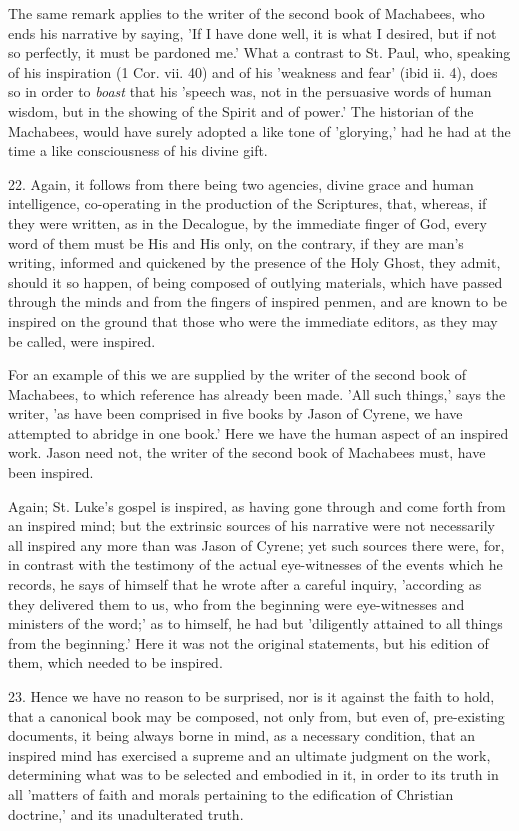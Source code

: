 The same remark applies to the writer of the
second book of Machabees, who ends his narrative by saying, 'If I have
done well, it is what I desired, but if not so perfectly, it must be
pardoned me.' What a contrast to St. Paul, who, speaking of his
inspiration (1 Cor. vii. 40) and of his 'weakness and fear' (ibid ii.
4), does so in order to \emph{boast} that his 'speech was, not in the
persuasive words of human wisdom, but in the showing of the Spirit and
of power.' The historian of the Machabees, would have surely adopted a
like tone of 'glorying,' had he had at the time a like consciousness
of his divine gift.

22. Again, it follows from there being two
agencies, divine grace and human intelligence, co-operating in the
production of the Scriptures, that, whereas, if they were written, as
in the Decalogue, by the immediate finger of God, every word of them
must be His and His only, on the contrary, if they are man's writing,
informed and quickened by the presence of the Holy Ghost, they admit,
should it so happen, of being composed of outlying materials, which
have passed through the minds and from the fingers of inspired penmen,
and are known to be inspired on the ground that those who were the
immediate editors, as they may be called, were inspired.

For an example of this we are supplied by the
writer of the second book of Machabees, to which reference has already
been made. 'All such things,' says the writer, 'as have been comprised
in five books by Jason of Cyrene, we have attempted to abridge in one
book.' Here we have the human aspect of an inspired work. Jason need
not, the writer of the second book of Machabees must, have been
inspired.

Again; St. Luke's gospel is inspired, as having
gone through and come forth from an inspired mind; but the extrinsic
sources of his narrative were not necessarily all inspired any more
than was Jason of Cyrene; yet such sources there were, for, in
contrast with the testimony of the actual eye-witnesses of the events
which he records, he says of himself that he wrote after a careful
inquiry, 'according as they delivered them to us, who from the
beginning were eye-witnesses and ministers of the word;' as to
himself, he had but 'diligently attained to all things from the
beginning.' Here it was not the original statements, but his edition
of them, which needed to be inspired.

23. Hence we have no reason to be surprised, nor
is it against the faith to hold, that a canonical book may be
composed, not only from, but even of, pre-existing documents, it being
always borne in mind, as a necessary condition, that an inspired mind
has exercised a supreme and an ultimate judgment on the work,
determining what was to be selected and embodied in it, in order to
its truth in all 'matters of faith and morals pertaining to the
edification of Christian doctrine,' and its unadulterated truth.

